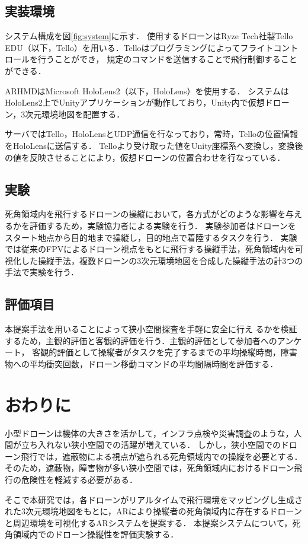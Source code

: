 \documentclass[a4paper,10pt,twocolumn,uplatex]{jsarticle}
\begin{document}
\subsection{実装環境}
システム構成を図\ref{fig:system}に示す．
使用するドローンはRyze Tech社製Tello EDU（以下，Tello）を用いる．Telloはプログラミングによってフライトコントロールを行うことができ，
規定のコマンドを送信することで飛行制御することができる．
\par
ARHMDはMicrosoft HoloLens2（以下，HoloLens）を使用する．
システムはHoloLens2上でUnityアプリケーションが動作しており，Unity内で仮想ドローン，3次元環境地図を配置する．
\par
サーバではTello，HoloLensとUDP通信を行なっており，常時，Telloの位置情報をHoloLensに送信する．
Telloより受け取った値をUnity座標系へ変換し，変換後の値を反映させることにより，仮想ドローンの位置合わせを行なっている．

\subsection{実験}
死角領域内を飛行するドローンの操縦において，各方式がどのような影響を与えるかを評価するため，実験協力者による実験を行う．
実験参加者はドローンをスタート地点から目的地まで操縦し，目的地点で着陸するタスクを行う．
実験では従来のFPVによるドローン視点をもとに飛行する操縦手法，死角領域内を可視化した操縦手法，複数ドローンの3次元環境地図を合成した操縦手法の計3つの手法で実験を行う．



\subsection{評価項目}
本提案手法を用いることによって狭小空間探査を手軽に安全に行え
るかを検証するため，主観的評価と客観的評価を行う．主観的評価として参加者へのアンケート，
客観的評価として操縦者がタスクを完了するまでの平均操縦時間，障害物への平均衝突回数，ドローン移動コマンドの平均間隔時間を評価する．


\section{おわりに}

小型ドローンは機体の大きさを活かして，インフラ点検や災害調査のような，人間が立ち入れない狭小空間での活躍が増えている．
しかし，狭小空間でのドローン飛行では，遮蔽物による視点が遮られる死角領域内での操縦を必要とする．
そのため，遮蔽物，障害物が多い狭小空間では，死角領域内におけるドローン飛行の危険性を軽減する必要がある．
\par
そこで本研究では，各ドローンがリアルタイムで飛行環境をマッピングし生成された3次元環境地図をもとに，ARにより操縦者の死角領域内に存在するドローンと周辺環境を可視化するARシステムを提案する．
本提案システムについて，死角領域内でのドローン操縦性を評価実験する．
\end{document}
